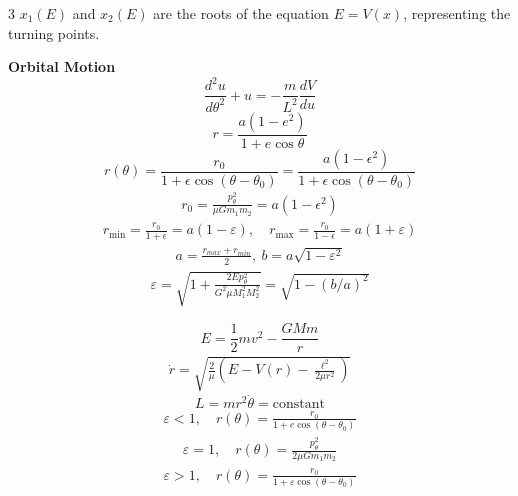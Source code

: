 \documentclass[1pt]{article}
\begin{document}
\begin{multicols}{3}
 $x_1(E)$ and $x_2(E)$ are the roots of the equation $E = V(x)$, representing the turning points.

\textbf{Orbital Motion}
\begin{equation*}
    \frac{d^2u}{d\theta^2} + u = -\frac{m}{L^2} \frac{dV}{du}
\end{equation*}
\begin{equation*}
    r = \frac{a(1 - e^2)}{1 + e\cos\theta}
\end{equation*}
\begin{equation*}
    r(\theta) = \frac{r_0}{1 + \epsilon\cos(\theta-\theta_0)}=\frac{a(1-\epsilon^2)}{1 + \epsilon\cos(\theta-\theta_0)}
\end{equation*}
\begin{align*}
    r_0 = \frac{p_\theta^2}{\mu G m_1 m_2}=a(1-\epsilon ^2)
\end{align*}
\begin{align*}
    r_{\min} = \frac{r_0}{1 + \epsilon}=a(1-\varepsilon), \quad r_{\max} = \frac{r_0}{1 - \epsilon}=a(1+\varepsilon)
\end{align*}
\begin{align*}
    a=\frac{r_{max}+r_{min}}{2},\ b=a\sqrt{1-\varepsilon^2}
\end{align*}
\begin{align*}
    \varepsilon=\sqrt{1+\frac{2E p_\theta^{2}}{G^{2}\mu M_{1}^{2}M_{2}^{2}}}=\sqrt{1-\left(b/a\right)^{2}}
\end{align*}

\begin{equation*}
    E = \frac{1}{2} m v^2 - \frac{GMm}{r}
\end{equation*}
\begin{align*}
    \dot{r} = \sqrt{\frac{2}{\mu} \left( E - V(r) - \frac{\ell^2}{2\mu r^2} \right)}
\end{align*}
\begin{equation*}
    L = m r^2 \dot{\theta} = \text{constant}
\end{equation*}
\begin{align*}
    \varepsilon<1, \quad r(\theta) = \frac{r_0}{1 + e \cos(\theta - \theta_0)}
\end{align*}
\begin{align*}
    \varepsilon = 1, \quad r(\theta) = \frac{p_\theta^2}{2\mu G m_1 m_2}
\end{align*}
\begin{align*}
    \varepsilon>1, \quad r(\theta) = \frac{r_0}{1 + \varepsilon \cos(\theta - \theta_0)}
\end{align*}
\begin{center}
\begin{tabular}{|>{\raggedright\arraybackslash}p{0.05\linewidth}|>{\raggedright\arraybackslash}p{0.35\linewidth}|l|} \hline 


\end{tabular}
\end{center}
\end{multicols}
\end{document}
